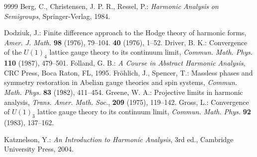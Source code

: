 \documentclass[11pt,reqno]{amsart}
\numberwithin{equation}{section}
\theoremstyle{remark}
\theoremstyle{rmdefinition}
\begin{document}
\begin{thebibliography}{9999}
 Berg, C., Christensen, J. P. R., Ressel, P.: {\em Harmonic Analysis on Semigroups}, Springer-Verlag, 1984.

 Dodziuk, J.: Finite difference approach to the Hodge theory of harmonic forms, {\em Amer. J. Math.} {\bf 98} (1976), 79--104.
{\bf 40} (1976), 1--52.
 Driver, B. K.: Convergence of the \(U(1)_4\) lattice gauge theory to its continuum limit, {\em Commun. Math. Phys.} {\bf 110} (1987), 479--501.  
 Folland, G. B.: {\em A Course in Abstract Harmonic Analysis}, CRC Press, Boca Raton, FL, 1995.
 Fröhlich, J., Spencer, T.: Massless phases and symmetry restoration in Abelian gauge theories and spin systems, {\em Commun. Math. Phys.} {\bf 83} (1982), 411--454.
 Greene, W. A.: Projective limits in harmonic analysis, {\em Trans. Amer. Math. Soc.}, {\bf 209} (1975), 119--142.
 Gross, L.: Convergence of \(U(1)_3\) lattice gauge theory to its continuum limit, {\em Commun. Math. Phys.} {\bf 92} (1983), 137–162.

 Katznelson, Y.: {\em An Introduction to Harmonic Analysis}, 3rd ed., Cambridge University Press, 2004.


\end{thebibliography}
\end{document}
